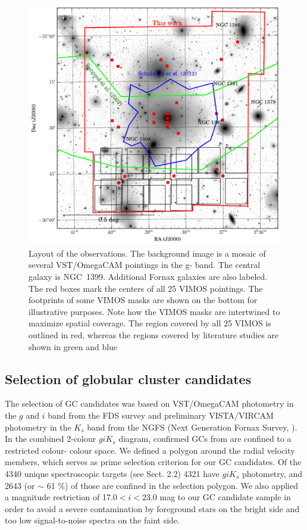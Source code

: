 \documentclass[useAMS,usenatbib]{mn2e}
\begin{document}
\begin{figure}
\centering
\includegraphics[scale=0.7]{figures/fov.png} 
\caption{Layout of the observations. The background image is a mosaic of several VST/OmegaCAM pointings in the g-
band. The central galaxy is NGC~1399. Additional Fornax galaxies are also labeled. The red boxes mark the centers of all 
25 VIMOS pointings. The footprints of some VIMOS masks are shown on the bottom for illustrative purposes. Note how 
the VIMOS masks are intertwined to maximize spatial coverage. The region covered by all 25 VIMOS is outlined in red, 
whereas the regions covered by literature studies are shown in green \citep{Bergond07} and blue \citep{Schuberth}}
\label{fig:fov}
\end{figure}

\subsection{Selection of globular cluster candidates}
\label{sec:selectionGC}
The selection of GC candidates was based on VST/OmegaCAM photometry in the $g$ and $i$ band from the FDS survey 
\citep{DAbrusco16,Iodice16} and preliminary VISTA/VIRCAM photometry in the $K_s$ band from the NGFS (Next 
Generation Fornax Survey, \citealt{Munoz14}). 
In the combined 2-colour $giK_s$ diagram, confirmed GCs from \citet{Schuberth} are confined to a restricted colour-
colour space. 
We defined a polygon around the radial velocity members, which serves as prime selection criterion for our GC candidates. 
Of the 4340 unique spectroscopic targets (see Sect. 2.2) 4321 have $giK_s$ photometry, and 2643 (or $\sim$ 61 \%) of those are confined in the selection polygon. 
We also applied a magnitude restriction of 17.0$<i<$23.0 mag to our GC candidate sample in order to avoid a severe contamination by foreground stars on the bright side and too low signal-to-noise spectra on the faint side. 
\end{document}
